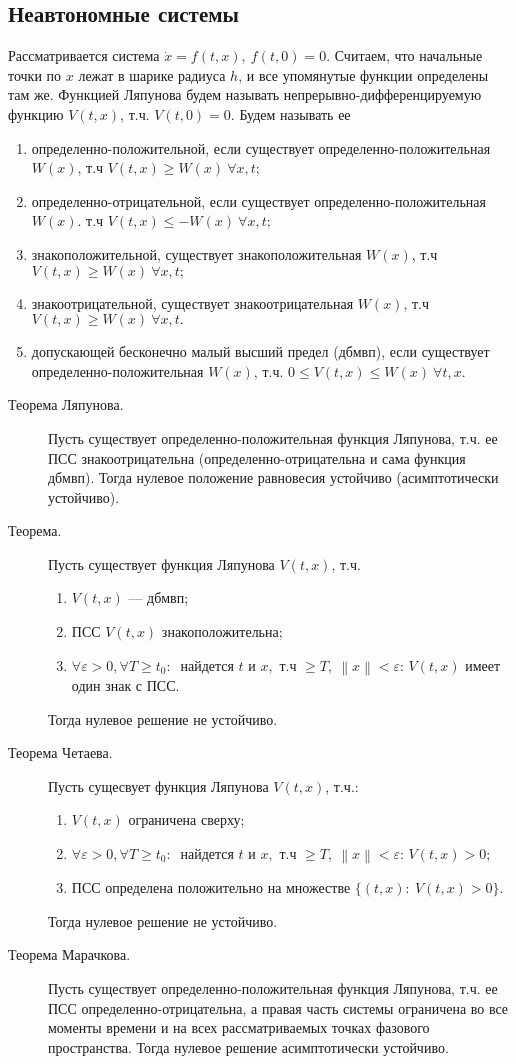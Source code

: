 \documentclass[a4paper,12pt]{scrartcl}
\newcommand{\norm}[1]{\left\lVert #1 \right\rVert}
\begin{document}
\subsection{Неавтономные системы}
Рассматривается система $\dot{x} = f(t,x),\ f(t,0)=0$. Считаем, что начальные точки по $x$ лежат в шарике радиуса $h$, и все упомянутые функции определены там же. Функцией Ляпунова будем называть непрерывно-дифференцируемую функцию $V(t,x)$, т.ч. $V(t,0)=0$.  Будем называть ее
\begin{enumerate}
 \item определенно-положительной, если существует определенно-положительная $W(x)$, т.ч $V(t,x)\geqslant W(x)\ \forall x,t;$
 \item определенно-отрицательной, если существует определенно-положительная $W(x)$. т.ч $V(t,x)\leqslant-W(x)\ \forall x,t;$
 \item знакоположительной, существует знакоположительная $W(x)$, т.ч $V(t,x)\geqslant W(x)\ \forall x,t;$
 \item знакоотрицательной, существует знакоотрицательная $W(x)$, т.ч $V(t,x)\geqslant W(x)\ \forall x,t.$
 \item допускающей бесконечно малый высший предел (дбмвп), если существует определенно-положительная $W(x)$, т.ч. $0 \leqslant V(t,x)\leqslant W(x)\ \forall t,x$.
\end{enumerate}
\begin{description}
 \item[Теорема Ляпунова.] Пусть существует определенно-положительная функция Ляпунова, т.ч. ее ПСС знакоотрицательна (определенно-отрицательна и сама функция дбмвп). Тогда нулевое положение равновесия устойчиво (асимптотически устойчиво). 
 \item[Теорема.] Пусть существует функция Ляпунова $V(t,x)$, т.ч.
\begin{enumerate}
 \item $V(t,x)$ --- дбмвп;  
 \item ПСС $V(t,x)$  знакоположительна;
 \item $\forall\varepsilon>0, \forall T\geqslant t_0:\ $ найдется $t$ и $x,$ т.ч $\geqslant T,\ \norm{x}<\varepsilon$: $V(t,x)$ имеет один знак с ПСС.
\end{enumerate}
Тогда нулевое решение не устойчиво.
 \item[Теорема Четаева.] Пусть сущесвует функция Ляпунова $V(t,x)$, т.ч.:
\begin{enumerate}
 \item $V(t,x)$ ограничена сверху;
 \item $\forall\varepsilon>0, \forall T\geqslant t_0:\ $ найдется $t$ и $x,$ т.ч $\geqslant T,\ \norm{x}<\varepsilon$: $V(t,x) >0$;
 \item ПСС определена положительно на множестве $\{(t,x):\ V(t,x) >0\}$.
\end{enumerate}
 Тогда нулевое решение не устойчиво.
\item[Теорема Марачкова.] Пусть существует определенно-положительная функция Ляпунова, т.ч. ее ПСС определенно-отрицательна, а правая часть системы ограничена во все моменты времени и на всех рассматриваемых точках фазового пространства. Тогда нулевое решение асимптотически устойчиво.
\end{description}
\end{document}
